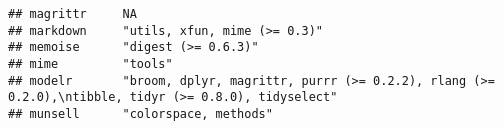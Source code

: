 \documentclass[]{book}
\begin{document}
\begin{verbatim}
## magrittr     NA                                                                                                                                                                                                                                                                                                                                                                                                                                                                                                          
## markdown     "utils, xfun, mime (>= 0.3)"                                                                                                                                                                                                                                                                                                                                                                                                                                                                                
## memoise      "digest (>= 0.6.3)"                                                                                                                                                                                                                                                                                                                                                                                                                                                                                         
## mime         "tools"                                                                                                                                                                                                                                                                                                                                                                                                                                                                                                     
## modelr       "broom, dplyr, magrittr, purrr (>= 0.2.2), rlang (>= 0.2.0),\ntibble, tidyr (>= 0.8.0), tidyselect"                                                                                                                                                                                                                                                                                                                                                                                                         
## munsell      "colorspace, methods"                                                                                                                                                                                                                                                                                                                                                                                                                                                                                       

\end{verbatim}
\end{document}
